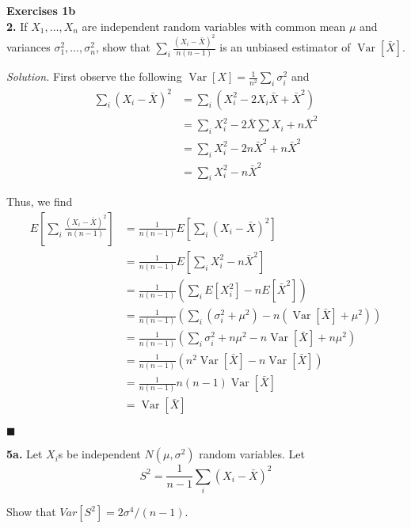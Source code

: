 \documentclass{article}
\newcommand{\Var}{\operatorname{Var}} %
\begin{document}
\setlength{\parindent}{0cm}   %



\textbf{Exercises 1b}
\\
\textbf{2.} If \(X_1, \ldots, X_n\) are independent random variables with common mean \(\mu\) and variances \( \sigma_1^2, \ldots, \sigma_n^2\), show that \( \sum_i \frac{ (X_i - \bar X )^2}{n(n-1)} \) is an unbiased estimator of \(\Var[\bar X] \). 


\vspace{3mm} 


\textit{Solution.} First observe the following \(\Var[X] = \frac{1}{n^2} \sum_i \sigma_i^2 \) and 
\begin{align*}
\sum_i (X_i - \bar X)^2 &= \sum_i (X_i^2 - 2X_i \bar X + \bar X^2) \\
&= \sum_i X_i^2 - 2 \bar X\sum X_i +  n\bar X^2 \\
&= \sum_i X_i^2 - 2n \bar X^2 +  n\bar X^2 \\
&= \sum_i X_i^2 - n \bar X^2
\end{align*} 

Thus, we find 
\begin{align*}
E\left[ \sum_i \frac{ (X_i - \bar X )^2}{n(n-1)} \right] &= \frac1{n(n-1)} E\left[\sum_i(X_i - \bar X )^2\right] \\
&= \frac1{n(n-1)} E\left[\sum_i X_i^2- n\bar X^2\right] \\
&= \frac1{n(n-1)} \left( \sum_i E[X_i^2]- nE[\bar X^2] \right) \\
&= \frac1{n(n-1)} \left( \sum_i (\sigma_i^2 + \mu^2) -n(\Var[\bar X] + \mu^2) \right) \\ 
&= \frac1{n(n-1)} \left( \sum_i \sigma_i^2 + n\mu^2 -n\Var[\bar X] + n\mu^2 \right) \\ 
&= \frac1{n(n-1)} \left( n^2 \Var[\bar X] - n\Var[\bar X] \right)\\
&= \frac1{n(n-1)}  n(n-1) \Var[\bar X] \\
&= \Var[\bar X] 
\end{align*} 


\begin{flushright}
\(\blacksquare\) 
\end{flushright}

\newpage
\textbf{5a.} Let \(X_i\)s be independent \(N(\mu, \sigma^2)\) random variables. Let \[
S^2 = \frac{1}{n-1} \sum_i (X_i-\bar X)^2
\]

Show that \(Var[S^2]=2\sigma^4/(n-1) \).
\end{document}
